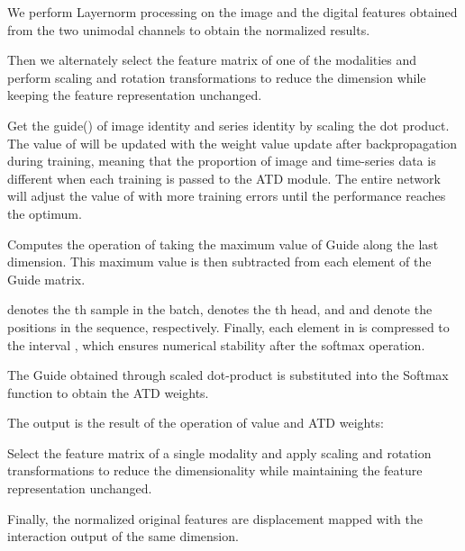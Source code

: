 \documentclass{ecai}
\begin{document}
We perform Layernorm processing on the image  and the digital features  obtained from the two unimodal channels to obtain the normalized results. 



Then we alternately select the feature matrix of one of the modalities and perform scaling and rotation transformations to reduce the dimension while keeping the feature representation unchanged.

Get the guide() of image identity  and series identity  by scaling the dot product. The value of  will be updated with the weight value update after backpropagation during training, meaning that the proportion of image and time-series data is different when each training is passed to the ATD module. The entire network will adjust the value of  with more training errors until the performance reaches the optimum.



Computes the operation of taking the maximum value of Guide along the last dimension. This maximum value is then subtracted from each element of the Guide matrix.



 denotes the th sample in the batch,  denotes the th head, and  and  denote the positions in the sequence, respectively. Finally, each element in  is compressed to the interval , which ensures numerical stability after the softmax operation.


The Guide obtained through scaled dot-product is substituted into the Softmax function to obtain the ATD weights.


The output is the result of the operation of value and  ATD weights:



Select the feature matrix of a single modality and apply scaling and rotation transformations to reduce the dimensionality while maintaining the feature representation unchanged.



Finally, the normalized original features are displacement mapped with the interaction output of the same dimension.
\end{document}
